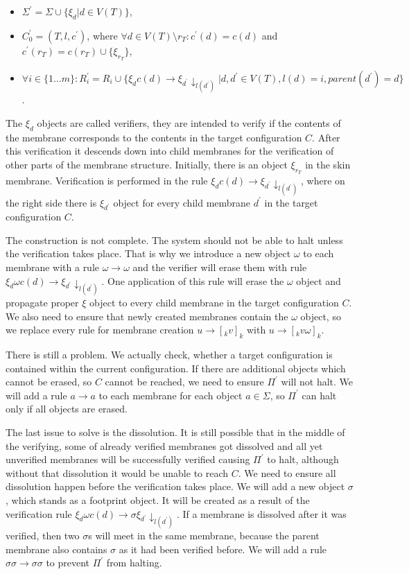 \documentclass[llncs,submission,copyright,creativecommons]{../lib/lncs/llncs}
\begin{document}
\begin{itemize}
  \item $\Sigma^\prime = \Sigma\cup\{\xi_d|d\in V(T)\}$,
  \item $C_0^\prime = (T, l, c^\prime)$, where $\forall d\in V(T)\setminus r_T: c^\prime(d) = c(d)$ and $c^\prime(r_T) = c(r_T)\cup\{\xi_{r_T}\}$,
  \item $\forall i\in\{1\dots m\}: R_i^\prime = R_i\cup\{\xi_d c(d)\rightarrow\xi_{d^\prime}\downarrow_{l(d^\prime)}|d,d^\prime\in V(T),l(d)=i,parent(d^\prime)=d\}$.
\end{itemize}

The $\xi_d$ objects are called verifiers, they are intended to verify if the contents of the membrane corresponds to the contents in the target configuration $C$. After this verification it descends down into child membranes for the verification of other parts of the membrane structure.
Initially, there is an object $\xi_{r_T}$ in the skin membrane. Verification is performed in the rule $\xi_d c(d)\rightarrow\xi_{d^\prime}\downarrow_{l(d^\prime)}$, where on the right side there is $\xi_{d^\prime}$ object for every child membrane $d^\prime$ in the target configuration $C$.

The construction is not complete. The system should not be able to halt unless the verification takes place. That is why we introduce a new object $\omega$ to each membrane with a rule $\omega\rightarrow\omega$ and the verifier will erase them with rule $\xi_d\omega c(d)\rightarrow\xi_{d^\prime}\downarrow_{l(d^\prime)}$. One application of this rule will erase the $\omega$ object and propagate proper $\xi$ object to every child membrane in the target configuration $C$. We also need to ensure that newly created membranes contain the $\omega$ object, so we replace every rule for membrane creation $u\rightarrow [_k v]_k$ with $u\rightarrow [_k v\omega]_k$.

There is still a problem. We actually check, whether a target configuration is contained within the current configuration. If there are additional objects which cannot be erased, so $C$ cannot be reached, we need to ensure $\Pi^\prime$ will not halt. We will add a rule $a\rightarrow a$ to each membrane for each object $a\in\Sigma$, so $\Pi^\prime$ can halt only if all objects are erased.

The last issue to solve is the dissolution. It is still possible that in the middle of the verifying, some of already verified membranes got dissolved and all yet unverified membranes will be successfully verified causing $\Pi^\prime$ to halt, although without that dissolution it would be unable to reach $C$. We need to ensure all dissolution happen before the verification takes place.
We will add a new object $\sigma$, which stands as a footprint object. It will be created as a result of the verification rule $\xi_d\omega c(d)\rightarrow\sigma\xi_{d^\prime}\downarrow_{l(d^\prime)}$. If a membrane is dissolved after it was verified, then two $\sigma$s will meet in the same membrane, because the parent membrane also contains $\sigma$ as it had been verified before. We will add a rule $\sigma\sigma\rightarrow\sigma\sigma$ to prevent $\Pi^\prime$ from halting.
\end{document}
